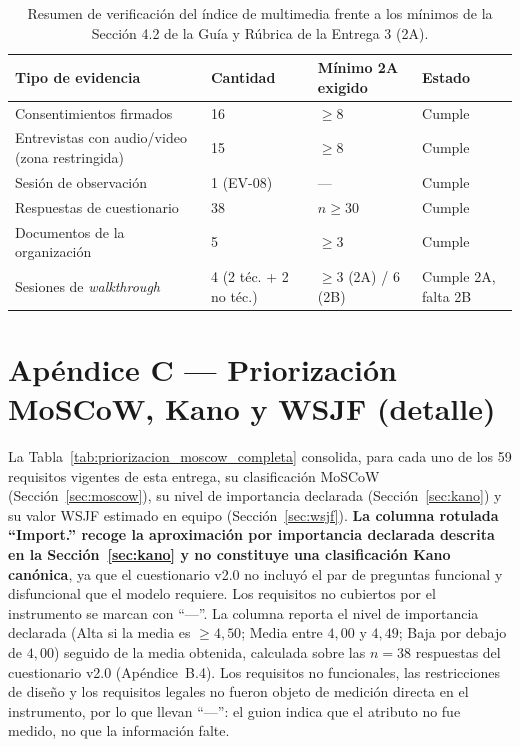 \documentclass[journal,onecolumn]{IEEEtran}
\begin{document}
	\begin{table}[H]
		\centering
		\small
		\caption{Resumen de verificación del índice de multimedia frente a los mínimos de la Sección 4.2 de la Guía y Rúbrica de la Entrega 3 (2A).}
		\label{tab:resumen-verificacion-mm}
		\begin{tabularx}{\textwidth}{@{}X l l l@{}}
			\toprule
			\textbf{Tipo de evidencia} & \textbf{Cantidad} & \textbf{Mínimo 2A exigido} & \textbf{Estado} \\
			\midrule
			Consentimientos firmados & 16 & $\geq 8$ & Cumple \\
			Entrevistas con audio/video (zona restringida) & 15 & $\geq 8$ & Cumple \\
			Sesión de observación & 1 (EV-08) & --- & Cumple \\
			Respuestas de cuestionario & 38 & $n \geq 30$ & Cumple \\
			Documentos de la organización & 5 & $\geq 3$ & Cumple \\
			Sesiones de \emph{walkthrough} & 4 (2 téc. + 2 no téc.) & $\geq 3$ (2A) / 6 (2B) & Cumple 2A, falta 2B \\
			\bottomrule
		\end{tabularx}
	\end{table}
	
	\newpage
	\section*{Apéndice C --- Priorización MoSCoW, Kano y WSJF (detalle)}
	\label{ap:priorizacion}
	
	La Tabla~\ref{tab:priorizacion_moscow_completa} consolida, para cada uno de
	los 59 requisitos vigentes de esta entrega, su clasificación MoSCoW
	(Sección~\ref{sec:moscow}), su nivel de importancia declarada
	(Sección~\ref{sec:kano}) y su valor WSJF estimado en equipo
	(Sección~\ref{sec:wsjf}). \textbf{La columna rotulada \enquote{Import.}
		recoge la aproximación por importancia declarada descrita en la
		Sección~\ref{sec:kano} y no constituye una clasificación Kano canónica},
	ya que el cuestionario v2.0 no incluyó el par de preguntas funcional y
	disfuncional que el modelo requiere. Los requisitos no cubiertos por el
	instrumento se marcan con \enquote{---}. La columna reporta el nivel de
	importancia declarada (Alta si la media es $\geq 4{,}50$; Media entre
	$4{,}00$ y $4{,}49$; Baja por debajo de $4{,}00$) seguido de la media
	obtenida, calculada sobre las $n = 38$ respuestas del cuestionario v2.0
	(Apéndice~B.4). Los requisitos no funcionales, las restricciones de diseño y
	los requisitos legales no fueron objeto de medición directa en el
	instrumento, por lo que llevan \enquote{---}: el guion indica que el atributo
	no fue medido, no que la información falte.
	
\end{document}
